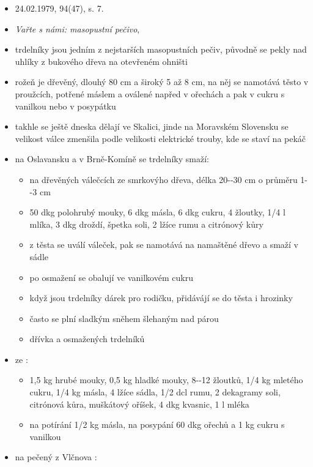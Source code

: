 \begin{itemize}
  \begin{itemize}
  \tightlist
  \item
    24.02.1979, 94(47), s. 7.
  \item
    \emph{Vařte s námi: masopustní pečivo}, 
  \item
    trdelníky jsou jedním z nejstarších masopustních pečiv, původně se
    pekly nad uhlíky z bukového dřeva na otevřeném ohništi
  \item
    rožeň je dřevěný, dlouhý 80 cm a široký 5 až 8 cm, na něj se
    namotává těsto v proužcích, potřené máslem a oválené napřed v
    ořechách a pak v cukru s vanilkou nebo v posypátku
  \item
    takhle se ještě dneska dělají ve Skalici, jinde na Moravském
    Slovensku se velikost válce zmenšila podle velikosti elektrické
    trouby, kde se staví na pekáč
  \item
    na Oslavansku  a v Brně-Komíně
     se trdelníky smaží:

    \begin{itemize}
    \tightlist
    \item
      na dřevěných válečcích ze smrkovýho dřeva, délka 20-\/-30 cm o
      průměru 1-\/-3 cm
    \item
      50 dkg polohrubý mouky, 6 dkg másla, 6 dkg cukru, 4 žloutky, 1/4 l
      mlíka, 3 dkg droždí, špetka soli, 2 lžíce rumu a citrónový kůry
    \item
      z těsta se uválí váleček, pak se namotává na namaštěné dřevo a
      smaží v sádle
    \item
      po osmažení se obalují ve vanilkovém cukru
    \item
      když jsou trdelníky dárek pro rodičku, přidávájí se do těsta i
      hrozinky
    \item
      často se plní sladkým sněhem šlehaným nad párou
    \item
       dřívka a osmažených trdelníků
    \end{itemize}
  \item
     ze  :

    \begin{itemize}
    \tightlist
    \item
      1,5 kg hrubé mouky, 0,5 kg hladké mouky, 8-\/-12 žloutků, 1/4 kg
      mletého cukru, 1/4 kg másla, 4 lžíce sádla, 1/2 dcl rumu, 2
      dekagramy soli, citrónová kůra, muškátový oříšek, 4 dkg kvasnic, 1
      l mléka
    \item
      na potírání 1/2 kg másla, na posypání 60 dkg ořechů a 1 kg cukru s
      vanilkou
    \end{itemize}
  \item
     na pečený z Vlčnova  :


\end{itemize}
\end{itemize}
